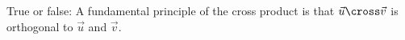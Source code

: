 \documentclass{ximera}
\author{Gregory Hartman \and Matthew Carr}
\begin{document}
\begin{exercise}
True or false: A fundamental principle of the cross product is that $\vec{u}\cross\vec{v}$ is orthogonal to $\vec{u}$ and $\vec{v}$.
\begin{multipleChoice}
\end{multipleChoice}

\end{exercise}
\end{document}
